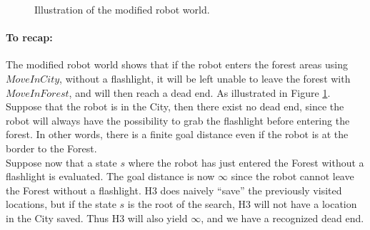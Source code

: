\documentclass[a4paper, 11pt]{article}
\begin{document}
\begin{figure}[h]



    \caption{Illustration of the modified robot world.}
    \label{fig:robotforest}
\end{figure}
\paragraph{To recap:} The modified robot world shows that if the robot enters the forest areas using $MoveInCity$, without a flashlight, it will be left unable to leave the forest with $MoveInForest$, and will then reach a dead end. As illustrated in Figure \ref{fig:robotforest}. \\

Suppose that the robot is in the City, then there exist no dead end, since the robot will always have the possibility to grab the flashlight before entering the forest. In other words, there is a finite goal distance even if the robot is at the border to the Forest.  \\

Suppose now that a state $s$ where the robot has just entered the Forest without a flashlight is evaluated. The goal distance is now $\infty$ since the robot cannot leave the Forest without a flashlight. H3 does naively ``save'' the previously visited locations, but if the state $s$ is the root of the search, H3 will not have a location in the City saved. Thus H3 will also yield $\infty$, and we have a recognized dead end. \\
\end{document}
